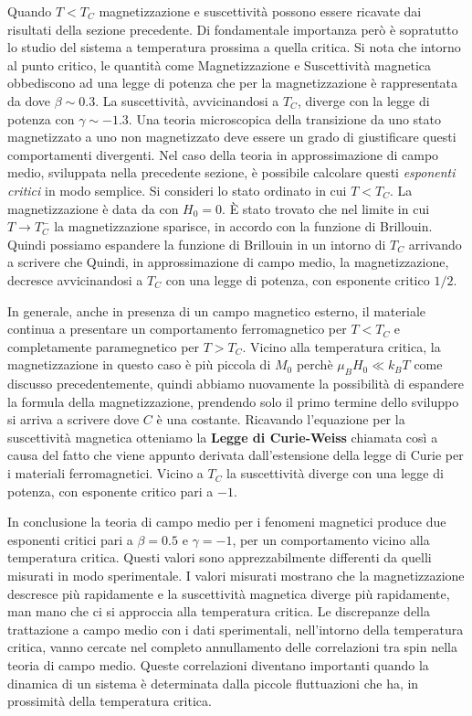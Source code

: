Quando $T < T_C$ magnetizzazione e suscettivit\`a possono essere ricavate dai risultati della sezione precedente. Di fondamentale importanza per\`o \`e sopratutto lo studio del sistema a temperatura prossima a quella critica. Si nota che intorno al punto critico, le quantit\`a come Magnetizzazione e Suscettivit\`a magnetica obbediscono ad una legge di potenza che per la magnetizzazione \`e rappresentata da
dove $\beta \sim 0.3$. La suscettivit\`a, avvicinandosi a $T_C$, diverge con la legge di potenza
con $\gamma \sim  -1.3$. Una teoria microscopica della transizione da uno stato magnetizzato a uno non magnetizzato deve essere un grado di giustificare questi comportamenti divergenti. Nel caso della teoria in approssimazione di campo medio, sviluppata nella precedente sezione, \`e possibile calcolare questi \textit{esponenti critici} in modo semplice. Si consideri lo stato ordinato in cui $T < T_C$. La magnetizzazione \`e data da 
con $H_0=0$. \`E stato trovato che nel limite in cui $T\to T_C^-$ la magnetizzazione sparisce, in accordo con la funzione di Brillouin. Quindi possiamo espandere la funzione di Brillouin in un intorno di $T_C$ arrivando a scrivere che 
Quindi, in approssimazione di campo medio, la magnetizzazione, decresce avvicinandosi a $T_C$ con una legge di potenza, con esponente critico $1/2$.

In generale, anche in presenza di un campo magnetico esterno, il materiale continua a presentare un comportamento ferromagnetico per  $T<T_C$ e completamente paramegnetico per $T>T_C$.
Vicino alla temperatura critica, la magnetizzazione in questo caso \`e pi\`u piccola di $M_0$ perch\`e $\mu_BH_0 \ll k_BT$ come discusso precedentemente, quindi abbiamo nuovamente la possibilit\`a di espandere la formula della magnetizzazione, prendendo solo il primo termine dello sviluppo si arriva a scrivere
dove $C$ \`e una costante. Ricavando l'equazione per la suscettivit\`a magnetica otteniamo la \textbf{Legge di Curie-Weiss}
chiamata cos\`i a causa del fatto che viene appunto derivata dall'estensione della legge di Curie per i materiali ferromagnetici. Vicino a $T_C$ la suscettivit\`a diverge con una legge di potenza, con esponente critico pari a $-1$. 

In conclusione la teoria di campo medio per i fenomeni magnetici produce due esponenti critici pari a $\beta = 0.5$ e $\gamma=-1$, per un comportamento vicino alla temperatura critica. Questi valori sono apprezzabilmente differenti da quelli misurati in modo sperimentale. I valori misurati mostrano che la magnetizzazione descresce pi\`u rapidamente e la suscettivit\`a magnetica diverge pi\`u rapidamente, man mano che ci si approccia alla temperatura critica. Le discrepanze della trattazione a campo medio con i dati sperimentali, nell'intorno della temperatura critica, vanno cercate nel completo annullamento delle correlazioni tra spin nella teoria di campo medio. Queste correlazioni diventano importanti quando la dinamica di un sistema \`e determinata dalla piccole fluttuazioni che ha, in prossimit\`a della temperatura critica.

